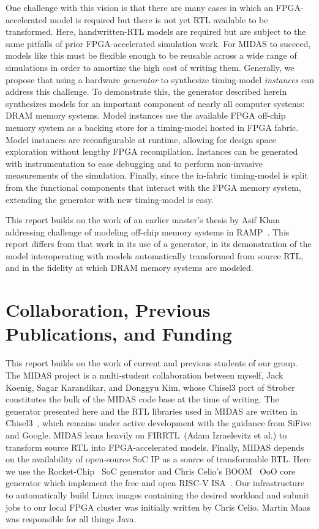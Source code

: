 One challenge with this vision is that there are many cases in which an
FPGA-accelerated model is required but there is not yet RTL available to be
transformed. Here, handwritten-RTL models are required but are subject to the same
pitfalls of prior FPGA-accelerated simulation work. For MIDAS to
succeed, models like this must be flexible enough to be reusable across a wide
range of simulations in order to amortize the high cost of writing them.
Generally, we propose that using a hardware \emph{generator} to synthesize
timing-model \emph{instances} can address this challenge. To demonstrate this, the
generator described herein synthesizes models for an important component of
nearly all computer systems: DRAM memory systems. Model instances use the
available FPGA off-chip memory system as a backing store for a timing-model
hosted in FPGA fabric. Model instances are reconfigurable at runtime, allowing for
design space exploration without lengthy FPGA recompilation. Instances can be
generated with instrumentation to ease debugging and to perform non-invasive
measurements of the simulation. Finally, since the in-fabric timing-model is
split from the functional components that interact with the FPGA memory system,
extending the generator with new timing-model is easy.

This report builds on the work of an earlier master's thesis by Asif
Khan~\cite{khanmasters} addressing challenge of modeling off-chip memory
systems in RAMP~\cite{ramp}. This report differs from that work in its use of
a generator, in its demonstration of the model interoperating with models
automatically transformed from source RTL, and in the fidelity at which
DRAM memory systems are modeled.

\section{Collaboration, Previous Publications, and Funding}

This report builds on the work of current and previous students of our group.
The MIDAS project is a multi-student collaboration between myself, Jack Koenig,
Sagar Karandikar, and Donggyu Kim, whose Chisel3 port of Strober~\cite{strober}
constitutes the bulk of the MIDAS code base at the time of writing. The
generator presented here and the RTL libraries used in MIDAS are written in
Chisel3~\cite{chisel}, which remains under active development with the guidance
from SiFive and Google. MIDAS leans heavily on FIRRTL~\cite{firrtl}(Adam
Izraelevitz et al.) to transform source RTL into FPGA-accelerated models.
Finally, MIDAS depends on the availability of open-source SoC IP as a source of
transformable RTL. Here we use the Rocket-Chip~\cite{rocketchip} SoC generator
and Chris Celio's BOOM~\cite{boom} OoO core generator which implement the free
and open RISC-V ISA~\cite{riscv}.  Our infrastructure to automatically build Linux images
containing the desired workload and submit jobs to our local FPGA cluster was
initially written by Chris Celio. Martin Maas was responsible for all things
Java.

